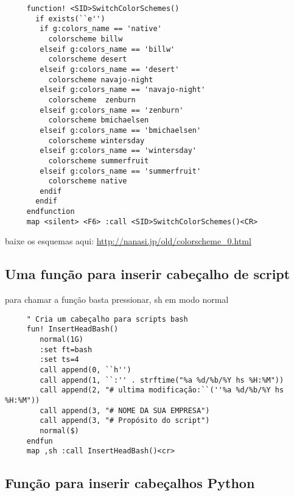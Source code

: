 \begin{verbatim}
     function! <SID>SwitchColorSchemes()
       if exists(``e'')
        if g:colors_name == 'native'
          colorscheme billw
        elseif g:colors_name == 'billw'
          colorscheme desert
        elseif g:colors_name == 'desert'
          colorscheme navajo-night
        elseif g:colors_name == 'navajo-night'
          colorscheme  zenburn
        elseif g:colors_name == 'zenburn'
          colorscheme bmichaelsen
        elseif g:colors_name == 'bmichaelsen'
          colorscheme wintersday
        elseif g:colors_name == 'wintersday'
          colorscheme summerfruit
        elseif g:colors_name == 'summerfruit'
          colorscheme native
        endif
       endif
     endfunction
     map <silent> <F6> :call <SID>SwitchColorSchemes()<CR>
\end{verbatim}

baixe os esquemas aqui:
\url{http://nanasi.jp/old/colorscheme_0.html}

\subsection{Uma função para inserir cabeçalho de script}
\label{Uma função para inserir cabeçalho de script bash}
para chamar a função
basta pressionar, sh em modo normal

\begin{verbatim}
     " Cria um cabeçalho para scripts bash
     fun! InsertHeadBash()
        normal(1G)
        :set ft=bash
        :set ts=4
        call append(0, ``h'')
        call append(1, ``:'' . strftime("%a %d/%b/%Y hs %H:%M"))
        call append(2, "# ultima modificação:``(''%a %d/%b/%Y hs %H:%M"))
        call append(3, "# NOME DA SUA EMPRESA")
        call append(3, "# Propósito do script")
        normal($)
     endfun
     map ,sh :call InsertHeadBash()<cr>
\end{verbatim}

\subsection{Função para inserir cabeçalhos Python}
\label{Função para inserir cabeçalhos python}

